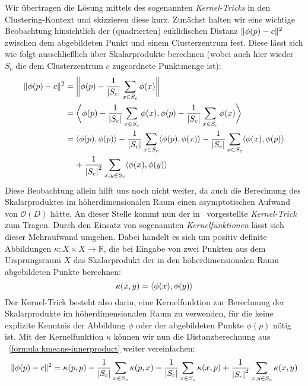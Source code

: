 Wir übertragen die Lösung mittels des sogenannten \emph{Kernel-Tricks} in den Clustering-Kontext und skizzieren diese kurz.
Zunächst halten wir eine wichtige Beobachtung hinsichtlich der (quadrierten) euklidischen Distanz $\lVert {\phi(p)} - {c} \rVert^2$
zwischen dem abgebildeten Punkt und einem Clusterzentrum fest. Diese lässt sich wie folgt ausschließlich über Skalarprodukte
berechnen (wobei auch hier wieder $S_c$ die dem Clusterzentrum $c$ zugeordnete Punktmenge ist):
\begin{align}
\label{formula:kmeans-innerproduct}
	\lVert {\phi(p)} - {c} \rVert^2 &= \bigg\lVert \phi(p) - \frac{1}{\left|S_c\right|} \sum_{x \in S_c} \phi(x) \bigg\rVert \notag \\
	&= \bigg\langle \phi(p) - \frac{1}{\left|S_c\right|} \sum_{x \in S_c} \phi(x),
		\phi(p) - \frac{1}{\left|S_c\right|} \sum_{x \in S_c} \phi(x) \bigg\rangle \notag \\
	&= \langle \phi(p), \phi(p) \rangle - \frac{1}{\left|S_c\right|} \sum_{x \in S_c} \langle \phi(p), \phi(x) \rangle
		- \frac{1}{\left|S_c\right|} \sum_{x \in S_c} \langle \phi(x), \phi(p) \rangle \notag \\
		& \hspace{0.4cm} + \frac{1}{\left|S_c\right|^2} \sum_{x,y \in S_c} \langle \phi(x), \phi(y) \rangle
\end{align}
Diese Beobachtung allein hilft uns noch nicht weiter, da auch die Berechnung des Skalarproduktes im höherdimensionalen
Raum einen asymptotischen Aufwand von $\mathcal{O}(D)$ hätte. An dieser Stelle kommt nun der in~\cite{BoserGV92} vorgestellte
\emph{Kernel-Trick} zum Tragen. Durch den Einsatz von sogenannten \emph{Kernelfunktionen} lässt sich dieser Mehraufwand
umgehen. Dabei handelt es sich um positiv definite Abbildungen $\kappa : X \times X \rightarrow \mathbb{R}$, die bei Eingabe von
zwei Punkten aus dem Ursprungsraum $X$ das Skalarprodukt der in den höherdimensionalen Raum abgebildeten Punkte berechnen:
\[ \kappa(x,y) = \langle \phi(x), \phi(y) \rangle \]
Der Kernel-Trick besteht also darin, eine Kernelfunktion zur Berechnung der Skalarprodukte im höherdimensionalen Raum zu
verwenden, für die keine explizite Kenntnis der Abbildung $\phi$ oder der abgebildeten Punkte $\phi(p)$ nötig ist.
Mit der Kernelfunktion $\kappa$ können wir nun die Distanzberechnung aus ~\ref{formula:kmeans-innerproduct} weiter vereinfachen:
\begin{align}
\label{formula:kernel-kmeans}
	\lVert {\phi(p)} - {c} \rVert^2 = \kappa(p,p) - \frac{1}{\left|S_c\right|} \sum_{x \in S_c} \kappa(p, x)
		- \frac{1}{\left|S_c\right|} \sum_{x \in S_c} \kappa(x, p)
		+ \frac{1}{\left|S_c\right|^2} \sum_{x,y \in S_c} \kappa(x, y)
\end{align}

